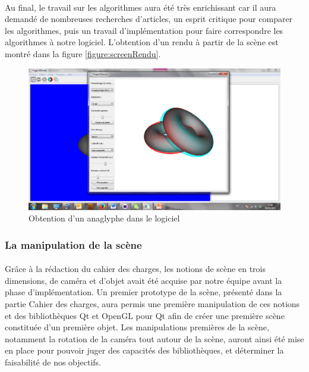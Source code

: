 \paragraph{}
Au final, le travail sur les algorithmes aura été très enrichissant car il aura demandé de nombreuses recherches d'articles, un esprit critique pour comparer les algorithmes, puis un travail d'implémentation pour faire correspondre les algorithmes à notre logiciel. L'obtention d'un rendu à partir de la scène est montré dans la figure \ref{figure:screenRendu}.

\begin{figure}[h]
	\centering
	\includegraphics[scale=0.3]{rendu.png}
	\caption{\label{fig:screenRendu} Obtention d'un anaglyphe dans le logiciel \protect}
\end{figure}

\subsubsection{La manipulation de la scène}
\paragraph{}
Grâce à la rédaction du cahier des charges, les notions de scène en trois dimensions, de caméra et d'objet avait été acquise par notre équipe avant la phase d'implémentation. Un premier prototype de la scène, présenté dans la partie Cahier des charges, aura permis une première manipulation de ces notions et des bibliothèques Qt et OpenGL pour Qt afin de créer une première scène constituée d'un première objet. Les manipulations premières de la scène, notamment la rotation de la caméra tout autour de la scène, auront ainsi été mise en place pour pouvoir juger des capacités des bibliothèques, et déterminer la faisabilité de nos objectifs.


